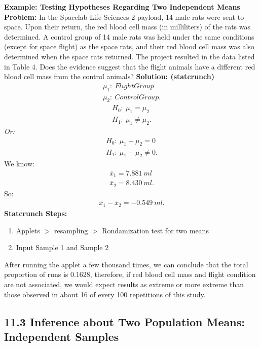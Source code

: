 \documentclass{report}
\begin{document}
    \bigbreak \noindent 
    \begin{mdframed}
      \textbf{Example: Testing Hypotheses Regarding Two Independent Means}
      \bigbreak \noindent 
      \textbf{Problem:}
      In the Spacelab Life Sciences 2 payload, 14 male rats were sent to space. Upon their return, the red blood cell mass (in milliliters) of the rats was determined. A control group of 14 male rats was held under the same conditions (except for space flight) as the space rats, and their red blood cell mass was also determined when the space rats returned. The project resulted in the data listed in Table 4. Does the evidence suggest that the flight animals have a different red blood cell mass from the control animals?
      \bigbreak \noindent 
      \textbf{Solution: (statcrunch)}
      \bigbreak \noindent 
      \begin{align*}
          \mu_{1}:\ Flight Group \\
          \mu_{2}:\ Control Group
      .\end{align*}
      \begin{align*}
          H_{0}:\ \mu_{1} = \mu_{2} \\
          H_{1}:\ \mu_{1} \ne \mu_{2}
      .\end{align*}
      \textit{Or:}
      \begin{align*}
          H_{0}:\ \mu_{1} - \mu_{2} = 0 \\
          H_{1}:\ \mu_{1} - \mu_{2} \ne 0 
      .\end{align*}
      We know:
      \begin{align*}
          \overline{x}_{1} = 7.881\ ml \\
          \overline{x}_{2} = 8.430\ ml
      .\end{align*}
      So:
      \begin{align*}
          \overline{x}_{1} - \overline{x}_{2} = -0.549\ ml
      .\end{align*}
      \bigbreak \noindent 
      \textbf{Statcrunch Steps:}
      \begin{enumerate}
          \item Applets $> $ resampling $> $ Rondamization test for two means 
            \item Input Sample 1 and Sample 2
      \end{enumerate}
      After running the applet a few thousand times, we can conclude that the total proportion of runs is 0.1628, therefore, if red blood cell mass and flight condition are not associated, we would expect results as extreme or more extreme than those observed in about 16 of every 100 repetitions of this study.
    \end{mdframed}

    \pagebreak 
    \subsection*{11.3 Inference about Two Population Means: Independent Samples}
    \bigbreak \noindent 


















    
\end{document}
